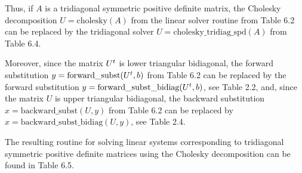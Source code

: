 
\begin{table}[H]
\centering
\caption{Cholesky decomposition for tridiagonal spd matrices}
\end{table}

Thus, if $A$ is a tridiagonal symmetric positive definite matrix, the Cholesky
decomposition $U = \text{cholesky}(A)$ from the linear solver routine from Table 6.2
can be replaced by the tridiagonal solver $U = \text{cholesky\_tridiag\_spd}(A)$ from
Table 6.4.

Moreover, since the matrix $U^{t}$ is lower triangular bidiagonal, the forward
substitution $y = \text{forward\_subst}(U^{t},b)$ from Table 6.2 can be replaced by the
forward substitution $y = \text{forward\_subst\_bidiag}(U^{t},b)$, see Table 2.2, and,
since the matrix $U$ is upper triangular bidiagonal, the backward substitution $x =
\text{backward\_subst}(U,y)$ from Table 6.2 can be replaced by $x =
\text{backward\_subst\_bidiag}(U,y)$, see Table 2.4.

The resulting routine for solving linear systems corresponding to tridiagonal
symmetric positive definite matrices using the Cholesky decomposition can be found in
Table 6.5.

